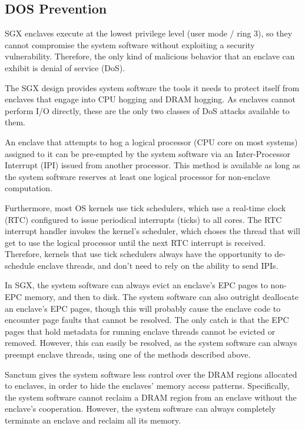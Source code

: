 \subsection{DOS Prevention}

SGX enclaves execute at the lowest privilege level (user mode / ring 3), so
they cannot compromise the system software without exploiting a security
vulnerability. Therefore, the only kind of malicious behavior that an enclave
can exhibit is denial of service (DoS).

The SGX design provides system software the tools it needs to protect itself
from enclaves that engage into CPU hogging and DRAM hogging. As enclaves cannot
perform I/O directly, these are the only two classes of DoS attacks available
to them.

An enclave that attempts to hog a logical processor (CPU core on most systems)
assigned to it can be pre-empted by the system software via an Inter-Processor
Interrupt (IPI) issued from another processor. This method is available as long
as the system software reserves at least one logical processor for non-enclave
computation.

Furthermore, most OS kernels use tick schedulers, which use a real-time clock
(RTC) configured to issue periodical interrupts (ticks) to all cores. The RTC
interrupt handler invokes the kernel's scheduler, which choses the thread that
will get to use the logical processor until the next RTC interrupt is received.
Therefore, kernels that use tick schedulers always have the opportunity to
de-schedule enclave threads, and don't need to rely on the ability to send
IPIs.

In SGX, the system software can always evict an enclave's EPC pages to non-EPC
memory, and then to disk. The system software can also outright deallocate an
enclave's EPC pages, though this will probably cause the enclave code to
encounter page faults that cannot be resolved. The only catch is that the EPC
pages that hold metadata for running enclave threads cannot be evicted or
removed. However, this can easily be resolved, as the system software can
always preempt enclave threads, using one of the methods described above.


Sanctum gives the system software less control over the DRAM regions allocated
to enclaves, in order to hide the enclaves' memory access patterns.
Specifically, the system software cannot reclaim a DRAM region from an enclave
without the enclave's cooperation. However, the system software can always
completely terminate an enclave and reclaim all its memory.

